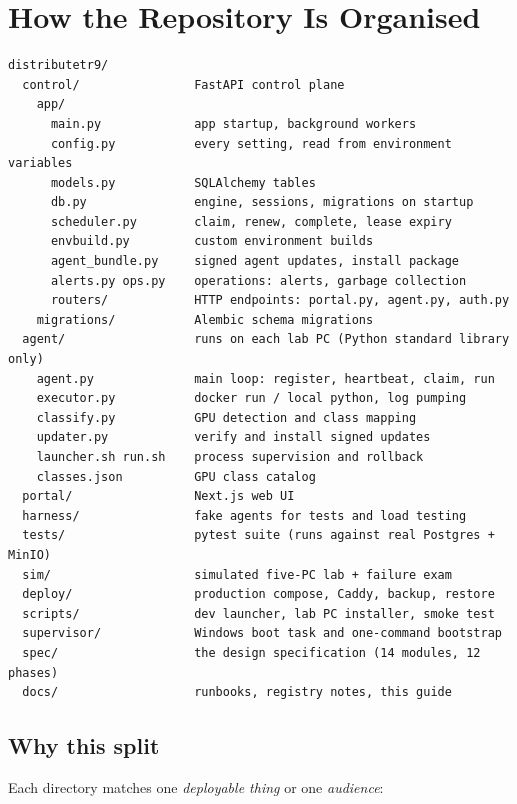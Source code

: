 \section{How the Repository Is Organised}

\begin{verbatim}
distributetr9/
  control/                FastAPI control plane
    app/
      main.py             app startup, background workers
      config.py           every setting, read from environment variables
      models.py           SQLAlchemy tables
      db.py               engine, sessions, migrations on startup
      scheduler.py        claim, renew, complete, lease expiry
      envbuild.py         custom environment builds
      agent_bundle.py     signed agent updates, install package
      alerts.py ops.py    operations: alerts, garbage collection
      routers/            HTTP endpoints: portal.py, agent.py, auth.py
    migrations/           Alembic schema migrations
  agent/                  runs on each lab PC (Python standard library only)
    agent.py              main loop: register, heartbeat, claim, run
    executor.py           docker run / local python, log pumping
    classify.py           GPU detection and class mapping
    updater.py            verify and install signed updates
    launcher.sh run.sh    process supervision and rollback
    classes.json          GPU class catalog
  portal/                 Next.js web UI
  harness/                fake agents for tests and load testing
  tests/                  pytest suite (runs against real Postgres + MinIO)
  sim/                    simulated five-PC lab + failure exam
  deploy/                 production compose, Caddy, backup, restore
  scripts/                dev launcher, lab PC installer, smoke test
  supervisor/             Windows boot task and one-command bootstrap
  spec/                   the design specification (14 modules, 12 phases)
  docs/                   runbooks, registry notes, this guide
\end{verbatim}

\subsection{Why this split}

Each directory matches one \emph{deployable thing} or one \emph{audience}:

